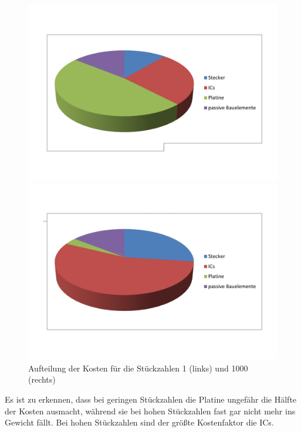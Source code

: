 \begin{figure}[h]
\begin{minipage}[h]{0.5\textwidth}
\includegraphics[width=\textwidth]{./Bilder/Platinenkosten.pdf}
\end{minipage}
\begin{minipage}[h]{0.5\textwidth}
\includegraphics[width=\textwidth]{./Bilder/Platinenkosten-tausend.pdf}
\end{minipage}
\caption{Aufteilung der Kosten für die Stückzahlen 1 (links) und 1000 (rechts)}
	\label{fig:LDO}
\end{figure}

Es ist zu erkennen, dass bei geringen Stückzahlen die Platine ungefähr die Hälfte der Kosten ausmacht, während sie bei hohen Stückzahlen fast gar nicht mehr ins Gewicht fällt. Bei hohen Stückzahlen sind der größte Kostenfaktor die ICs. 


